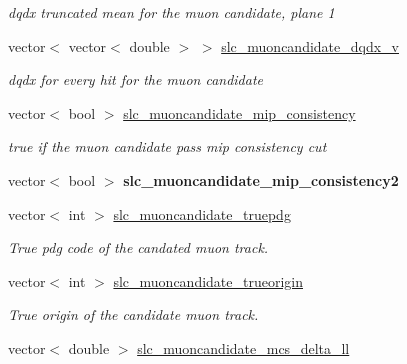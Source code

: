 \begin{DoxyCompactItemize}
\begin{DoxyCompactList}\small\item\em dqdx truncated mean for the muon candidate, plane 1 \end{DoxyCompactList}\item 
\hypertarget{classUBXSecEvent_ad66a437d850fb4a5f8fd39bffcb540ae}{vector$<$ vector$<$ double $>$ $>$ \hyperlink{classUBXSecEvent_ad66a437d850fb4a5f8fd39bffcb540ae}{slc\-\_\-muoncandidate\-\_\-dqdx\-\_\-v}}\label{classUBXSecEvent_ad66a437d850fb4a5f8fd39bffcb540ae}

\begin{DoxyCompactList}\small\item\em dqdx for every hit for the muon candidate \end{DoxyCompactList}\item 
\hypertarget{classUBXSecEvent_a535d450659bbc041a675b3c602650ce5}{vector$<$ bool $>$ \hyperlink{classUBXSecEvent_a535d450659bbc041a675b3c602650ce5}{slc\-\_\-muoncandidate\-\_\-mip\-\_\-consistency}}\label{classUBXSecEvent_a535d450659bbc041a675b3c602650ce5}

\begin{DoxyCompactList}\small\item\em true if the muon candidate pass mip consistency cut \end{DoxyCompactList}\item 
\hypertarget{classUBXSecEvent_aeeaf9707b06c88065ce6a7ce56bcbbec}{vector$<$ bool $>$ {\bfseries slc\-\_\-muoncandidate\-\_\-mip\-\_\-consistency2}}\label{classUBXSecEvent_aeeaf9707b06c88065ce6a7ce56bcbbec}

\item 
\hypertarget{classUBXSecEvent_a861fa153e7ab975f01780edfaf8f280c}{vector$<$ int $>$ \hyperlink{classUBXSecEvent_a861fa153e7ab975f01780edfaf8f280c}{slc\-\_\-muoncandidate\-\_\-truepdg}}\label{classUBXSecEvent_a861fa153e7ab975f01780edfaf8f280c}

\begin{DoxyCompactList}\small\item\em True pdg code of the candated muon track. \end{DoxyCompactList}\item 
\hypertarget{classUBXSecEvent_a6013262692b0ae27bd36a28dde410c72}{vector$<$ int $>$ \hyperlink{classUBXSecEvent_a6013262692b0ae27bd36a28dde410c72}{slc\-\_\-muoncandidate\-\_\-trueorigin}}\label{classUBXSecEvent_a6013262692b0ae27bd36a28dde410c72}

\begin{DoxyCompactList}\small\item\em True origin of the candidate muon track. \end{DoxyCompactList}\item 
\hypertarget{classUBXSecEvent_a2debf701edaaaf07b40603c5196c9df0}{vector$<$ double $>$ \hyperlink{classUBXSecEvent_a2debf701edaaaf07b40603c5196c9df0}{slc\-\_\-muoncandidate\-\_\-mcs\-\_\-delta\-\_\-ll}}\label{classUBXSecEvent_a2debf701edaaaf07b40603c5196c9df0}


\end{DoxyCompactItemize}
